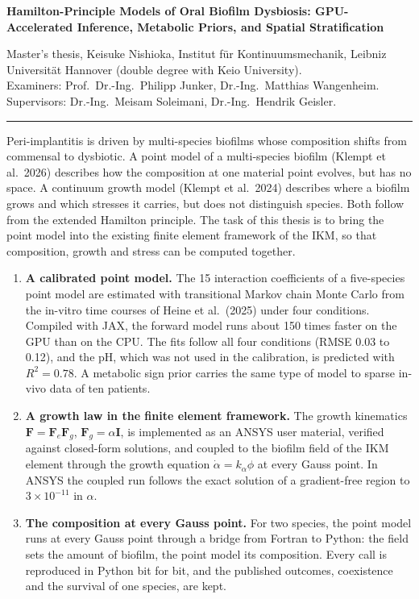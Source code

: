 \documentclass[11pt,a4paper]{article}
\newcommand{\sect}[1]{\par\vspace{5pt}{\color{c3}\bfseries #1}\par\vspace{1pt}}
\begin{document}
{\large\bfseries Hamilton-Principle Models of Oral Biofilm Dysbiosis:
GPU-Accelerated Inference, Metabolic Priors, and Spatial Stratification}\par
\vspace{3pt}
Master's thesis, Keisuke Nishioka, Institut für Kontinuumsmechanik, Leibniz
Universität Hannover (double degree with Keio University).\\
Examiners: Prof.\ Dr.-Ing.\ Philipp Junker, Dr.-Ing.\ Matthias Wangenheim.
Supervisors: Dr.-Ing.\ Meisam Soleimani, Dr.-Ing.\ Hendrik Geisler.
\par\vspace{2pt}\hrule

\sect{Motivation}
Peri-implantitis is driven by multi-species biofilms whose composition shifts
from commensal to dysbiotic. A point model of a multi-species biofilm (Klempt
et al.\ 2026) describes how the composition at one material point evolves, but
has no space. A continuum growth model (Klempt et al.\ 2024) describes where a
biofilm grows and which stresses it carries, but does not distinguish species.
Both follow from the extended Hamilton principle. The task of this thesis is to
bring the point model into the existing finite element framework of the IKM, so
that composition, growth and stress can be computed together.

\sect{Contributions}
\begin{enumerate}
\item \textbf{A calibrated point model.} The 15 interaction coefficients of a
  five-species point model are estimated with transitional Markov chain Monte
  Carlo from the in-vitro time courses of Heine et al.\ (2025) under four
  conditions. Compiled with JAX, the forward model runs about 150 times faster
  on the GPU than on the CPU. The fits follow all four conditions (RMSE 0.03 to
  0.12), and the pH, which was not used in the calibration, is predicted with
  $R^2=0.78$. A metabolic sign prior carries the same type of model to sparse
  in-vivo data of ten patients.
\item \textbf{A growth law in the finite element framework.} The growth
  kinematics $\mathbf F=\mathbf F_e\mathbf F_g$, $\mathbf F_g=\alpha\mathbf I$,
  is implemented as an ANSYS user material, verified against closed-form
  solutions, and coupled to the biofilm field of the IKM element through the
  growth equation $\dot\alpha=k_\alpha\phi$ at every Gauss point. In ANSYS the
  coupled run follows the exact solution of a gradient-free region to
  $3\times10^{-11}$ in $\alpha$.
\item \textbf{The composition at every Gauss point.} For two species, the point
  model runs at every Gauss point through a bridge from Fortran to Python: the
  field sets the amount of biofilm, the point model its composition. Every call
  is reproduced in Python bit for bit, and the published outcomes, coexistence
  and the survival of one species, are kept.
\end{enumerate}
\end{document}
